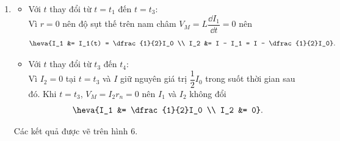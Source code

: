 \begin{loigiai}\[\]
\begin{enumerate}[1)]
    \item 
    \begin{itemize}
        \item Với $t$ thay đổi từ $t = t_1 $ đến $t = t_3$:\\
    Vì $r = 0$ nên độ sụt thế trên nam châm $V_M = L\dfrac{\dd I_1}{\dd t} = 0$ nên
    \[\heva{I_1 &= I_1(t) = \dfrac{1}{2}I_0 \\ I_2 &= I - I_1 = I - \dfrac{1}{2}I_0}.\]
    \item Với $t$ thay đổi từ $t_3$ đến $t_4$:\\
    Vì $I_2 = 0$ tại $t = t_3$ và $I$ giữ nguyên giá trị $\dfrac{1}{2}I_0$ trong suốt thời gian sau đó. Khi $t = t_3$, $V_M = I_2r_n = 0$ nên $I_1$ và $I_2$ không đổi
    \[\heva{I_1 &= \dfrac{1}{2}I_0 \\ I_2 &= 0}.\]
    \end{itemize}
    Các kết quả được vẽ trên hình $6$.
    \begin{center}
        


\begin{tikzpicture}[x=0.75pt,y=0.75pt,yscale=-1,xscale=1]


\end{tikzpicture}
\end{center}
\end{enumerate}
\end{loigiai}
